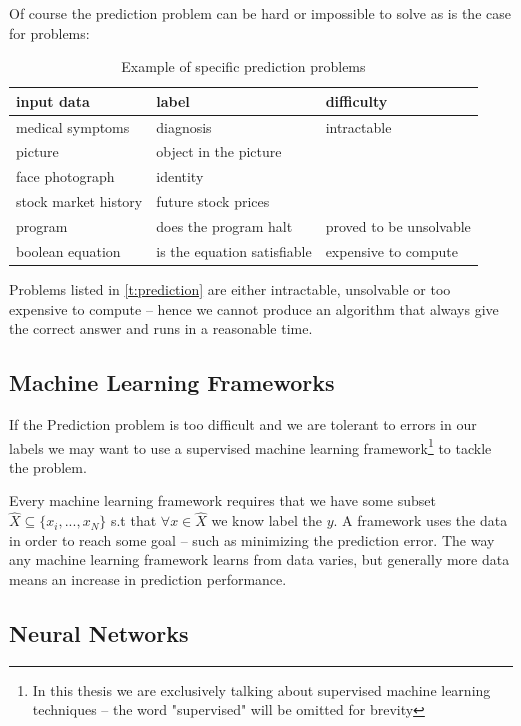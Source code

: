 \documentclass[dissertation.tex]{subfiles}
\begin{document}
Of course the prediction problem can be hard or impossible to solve as is the
case for problems:
\begin{table}[H]
  \centering
    \begin{tabular}{l|l|l}
      input data & label & difficulty \\ 
      \hline
      \rowcolor{Gray}
      medical symptoms & diagnosis & intractable \\ 
      picture  & object in the picture &  \\ 
      \rowcolor{Gray}
      face photograph  & identity &  \\ 
      stock market history  & future stock prices &  \\ 
      \rowcolor{Gray}
      program  & does the program halt & proved to be unsolvable \\ 
      boolean equation  & is the equation satisfiable & expensive to compute 
  \end{tabular}
  \caption{Example of specific prediction problems }
  \label{t:prediction}
\end{table}

Problems listed in \autoref{t:prediction} are either intractable, unsolvable or
too expensive to compute -- hence we cannot produce an algorithm that always
give the correct answer and runs in a reasonable time.

\subsection{Machine Learning Frameworks}

If the Prediction problem is too difficult and we are tolerant to errors in our
labels we may want to use a supervised machine learning framework\footnote{In
this thesis we are exclusively talking about supervised machine learning
techniques -- the word "supervised" will be omitted for brevity} to tackle the
problem. 

Every machine learning framework requires that we have some subset
$\hat{X}\subseteq\{x_i,...,x_N\}$ s.t that $ \forall x\in\hat{X}$ we know label
the $y$. A framework uses the data in order to reach some goal -- such as
minimizing the prediction error. The way any machine learning framework learns
from data varies, but generally more data means an increase in prediction
performance.

\subsection{Neural Networks} 
\end{document}
